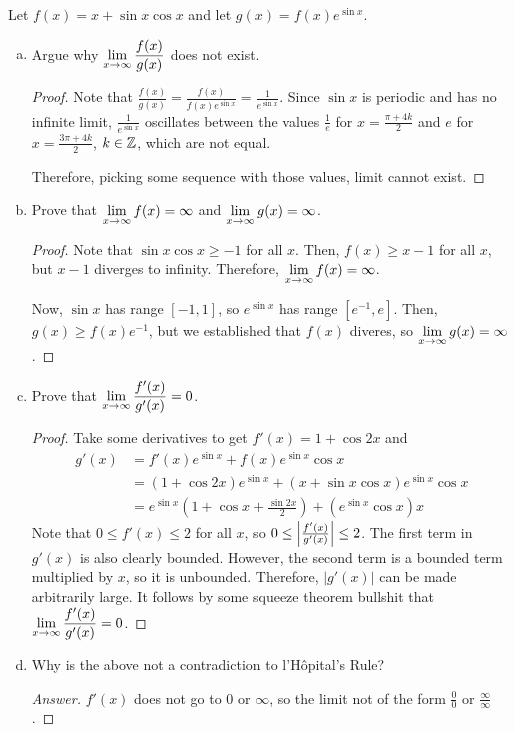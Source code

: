 \question Let $f(x) = x + \sin x \cos x$ and let $g(x) = f(x)e^{\sin x}$.
\begin{enumerate}[(a)]
  \item Argue why $\displaystyle\lim_{x\to\infty}\frac{f(x)}{g(x)}$ does not exist.
        \begin{proof}
          Note that $\frac{f(x)}{g(x)} = \frac{f(x)}{f(x)e^{\sin x}} = \frac{1}{e^{\sin x}}$.
          Since $\sin x$ is periodic and has no infinite limit,
          $\frac{1}{e^{\sin x}}$ oscillates between the values
          $\frac{1}{e}$ for $x = \frac{\pi+4k}{2}$ and $e$ for $x = \frac{3\pi+4k}{2}$, $k\in\mathbb{Z}$,
          which are not equal.

          Therefore, picking some sequence with those values, limit cannot exist.
        \end{proof}

  \item Prove that $\displaystyle\lim_{x\to\infty}f(x) = \infty$ and $\displaystyle\lim_{x\to\infty}g(x) = \infty$.
        \begin{proof}
          Note that $\sin x\cos x \geq -1$ for all $x$.
          Then, $f(x) \geq x - 1$ for all $x$, but $x-1$ diverges to infinity.
          Therefore, $\displaystyle\lim_{x\to\infty}f(x) = \infty$.

          Now, $\sin x$ has range $[-1,1]$, so $e^{\sin x}$ has range $[e^{-1},e]$.
          Then, $g(x) \geq f(x)e^{-1}$, but we established that $f(x)$ diveres, so $\displaystyle\lim_{x\to\infty}g(x) = \infty$.
        \end{proof}
  \item Prove that $\displaystyle\lim_{x\to\infty}\frac{f'(x)}{g'(x)} = 0$.
        \begin{proof}
          Take some derivatives to get $f'(x) = 1 + \cos 2x$ and
          \begin{align*}
            g'(x) & = f'(x)e^{\sin x} + f(x)e^{\sin x}\cos x                         \\
                  & = (1 + \cos 2x)e^{\sin x} + (x + \sin x \cos x)e^{\sin x}\cos x  \\
                  & = e^{\sin x}(1 + \cos x + \frac{\sin 2x}{2}) + (e^{\sin x}\cos x)x
          \end{align*}
          Note that $0 \leq f'(x) \leq 2$ for all $x$, so $0 \leq \abs{\frac{f'(x)}{g'(x)}} \leq 2$.
          The first term in $g'(x)$ is also clearly bounded.
          However, the second term is a bounded term multiplied by $x$, so it is unbounded.
          Therefore, $|g'(x)|$ can be made arbitrarily large.
          It follows by some squeeze theorem bullshit that $\displaystyle\lim_{x\to\infty}\frac{f'(x)}{g'(x)} = 0$.
        \end{proof}
  \item Why is the above not a contradiction to l'Hôpital's Rule?
        \begin{proof}[Answer]
          $f'(x)$ does not go to 0 or $\infty$,
          so the limit not of the form $\frac{0}{0}$ or $\frac{\infty}{\infty}$.
        \end{proof}
\end{enumerate}

